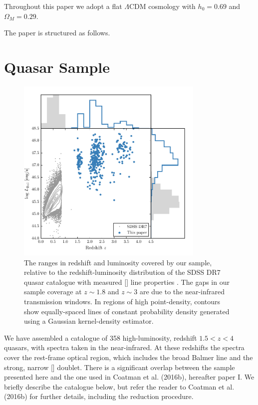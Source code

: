 Throughout this paper we adopt a flat $\Lambda$CDM cosmology with $h_0=0.69$ and $\Omega_M=0.29$. 

The paper is structured as follows. 

\section{Quasar Sample}

\begin{figure}
    \includegraphics[width=0.8\textwidth]{figures/chapter04/luminosity_z.pdf} 
    \caption{The ranges in redshift and luminosity covered by our sample, relative to the redshift-luminosity distribution of the SDSS DR7 quasar catalogue with measured [] line properties \citep{shen11}. The gaps in our sample coverage at $z\sim1.8$ and $z\sim3$ are due to the near-infrared transmission windows. In regions of high point-density, contours show equally-spaced lines of constant probability density generated using a Gaussian kernel-density estimator.}     
    \label{fig:lzplane}
\end{figure}

We have assembled a catalogue of 358 high-luminosity, redshift $1.5 < z < 4$ quasars, with spectra taken in the near-infrared.
At these redshifts the spectra cover the rest-frame optical region, which includes the broad Balmer \hb line and the strong, narrow [] doublet. 
There is a significant overlap between the sample presented here and the one used in Coatman et al. (2016b), hereafter paper I.  
We briefly describe the catalogue below, but refer the reader to Coatman et al. (2016b) for further details, including the reduction procedure.  

